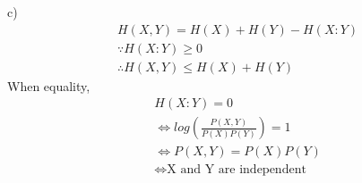 \begin{note}{c)}
    \begin{align*}
        &H(X, Y) = H(X) + H(Y) - H(X: Y) \\
        &\because H(X:Y) \geq 0 \\
        &\therefore H(X, Y) \leq H(X) + H(Y)
    \end{align*}
    When equality, 
    \begin{align*}
        &H(X:Y)=0 \\ 
        &\iff log(\frac{P(X, Y)}{P(X)P(Y)}) = 1 \\
        &\iff P(X, Y) = P(X)P(Y) \\
        &\iff \text{X and Y are independent}
    \end{align*}
\end{note}